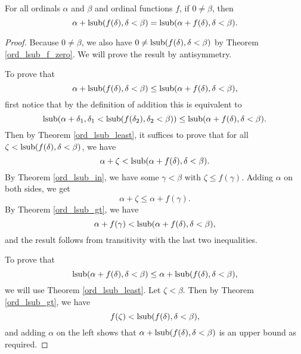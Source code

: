 \documentclass[../../math.tex]{subfiles}
\begin{document}
\begin{theorem} \label{ord_lsub_plus}
    For all ordinals $\alpha$ and $\beta$ and ordinal functions $f$, if $0 \neq
    \beta$, then
    \[
        \alpha + \operatorname{lsub}(f(\delta), \delta < \beta)
        = \operatorname{lsub}(\alpha + f(\delta), \delta < \beta).
    \]
\end{theorem}
\begin{proof}
    Because $0 \neq \beta$, we also have $0 \neq \operatorname{lsub}(f(\delta), \delta <
    \beta)$ by Theorem \ref{ord_lsub_f_zero}.  We will prove the result by
    antisymmetry.

    To prove that
    \[
        \alpha + \operatorname{lsub}(f(\delta), \delta < \beta)
        \leq \operatorname{lsub}(\alpha + f(\delta), \delta < \beta),
    \]
    first notice that by the definition of addition this is equivalent to
    \[
        \operatorname{lsub}(\alpha + \delta_1, \delta_1 < \operatorname{lsub}(f(\delta_2), \delta_2 <
        \beta)) \leq \operatorname{lsub}(\alpha + f(\delta), \delta < \beta).
    \]
    Then by Theorem \ref{ord_lsub_least}, it suffices to prove that for all
    $\zeta < \operatorname{lsub}(f(\delta), \delta < \beta)$, we have
    \[
        \alpha + \zeta < \operatorname{lsub}(\alpha + f(\delta), \delta < \beta).
    \]
    By Theorem \ref{ord_lsub_in}, we have some $\gamma < \beta$ with $\zeta
    \leq f(\gamma)$.  Adding $\alpha$ on both sides, we get
    \[
        \alpha + \zeta \leq \alpha + f(\gamma).
    \]
    By Theorem \ref{ord_lsub_gt}, we have
    \[
        \alpha + f(\gamma) < \operatorname{lsub}(\alpha + f(\delta), \delta < \beta),
    \]
    and the result follows from transitivity with the last two inequalities.

    To prove that
    \[
        \operatorname{lsub}(\alpha + f(\delta), \delta < \beta)
        \leq \alpha + \operatorname{lsub}(f(\delta), \delta < \beta),
    \]
    we will use Theorem \ref{ord_lsub_least}.  Let $\zeta < \beta$.  Then by
    Theorem \ref{ord_lsub_gt}, we have
    \[
        f(\zeta) < \operatorname{lsub}(f(\delta), \delta < \beta),
    \]
    and adding $\alpha$ on the left shows that $\alpha + \operatorname{lsub}(f(\delta), \delta
    < \beta)$ is an upper bound as required.
\end{proof}
\end{document}
